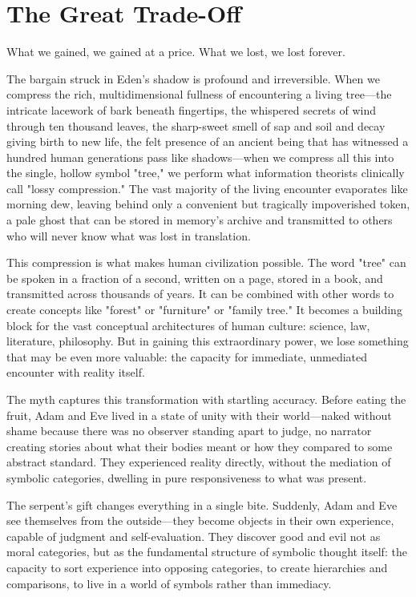 \section{The Great Trade-Off}

What we gained, we gained at a price. What we lost, we lost forever.

The bargain struck in Eden's shadow is profound and irreversible. When we compress the rich, multidimensional fullness of encountering a living tree—the intricate lacework of bark beneath fingertips, the whispered secrets of wind through ten thousand leaves, the sharp-sweet smell of sap and soil and decay giving birth to new life, the felt presence of an ancient being that has witnessed a hundred human generations pass like shadows—when we compress all this into the single, hollow symbol "tree," we perform what information theorists clinically call "lossy compression." The vast majority of the living encounter evaporates like morning dew, leaving behind only a convenient but tragically impoverished token, a pale ghost that can be stored in memory's archive and transmitted to others who will never know what was lost in translation.

This compression is what makes human civilization possible. The word "tree" can be spoken in a fraction of a second, written on a page, stored in a book, and transmitted across thousands of years. It can be combined with other words to create concepts like "forest" or "furniture" or "family tree." It becomes a building block for the vast conceptual architectures of human culture: science, law, literature, philosophy. But in gaining this extraordinary power, we lose something that may be even more valuable: the capacity for immediate, unmediated encounter with reality itself.

The myth captures this transformation with startling accuracy. Before eating the fruit, Adam and Eve lived in a state of unity with their world—naked without shame because there was no observer standing apart to judge, no narrator creating stories about what their bodies meant or how they compared to some abstract standard. They experienced reality directly, without the mediation of symbolic categories, dwelling in pure responsiveness to what was present.

The serpent's gift changes everything in a single bite. Suddenly, Adam and Eve see themselves from the outside—they become objects in their own experience, capable of judgment and self-evaluation. They discover good and evil not as moral categories, but as the fundamental structure of symbolic thought itself: the capacity to sort experience into opposing categories, to create hierarchies and comparisons, to live in a world of symbols rather than immediacy.

